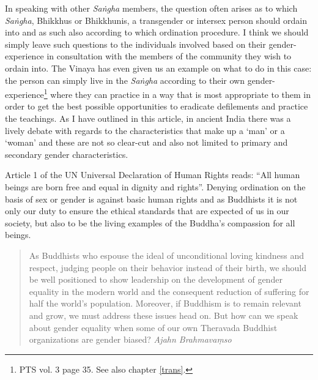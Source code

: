 In speaking with other {\em Saṅgha} members, the question often arises as to which {\em Saṅgha}, Bhikkhus or Bhikkhunis, a transgender or intersex person should ordain into and as such also according to which ordination procedure. I think we should simply leave such questions to the individuals involved based on their gender-experience in consultation with the members of the community they wish to ordain into. The Vinaya has even given us an example on what to do in this case: the person can simply live in the {\em Saṅgha} according to their own gender-experience\footnote{PTS vol. 3 page 35. See also chapter \ref{trans}.} where they can practice in a way that is most appropriate to them in order to get the best possible opportunities to eradicate defilements and practice the teachings. As I have outlined in this article, in ancient India there was a lively debate with regards to the characteristics that make up a `man' or a `woman' and these are not so clear-cut and also not limited to primary and secondary gender characteristics.

Article 1 of the UN Universal Declaration of Human Rights reads: ``All human beings are born free and equal in dignity and rights''. Denying ordination on the basis of sex or gender is against basic human rights and as Buddhists it is not only our duty to ensure the ethical standards that are expected of us in our society, but also to be the living examples of the Buddha's compassion for all beings.

\begin{quote}
As Buddhists who espouse the ideal of unconditional loving kindness and respect, judging people on their behavior instead of their birth, we should be well positioned to show leadership on the development of gender equality in the modern world and the consequent reduction of suffering for half the world’s population. Moreover, if Buddhism is to remain relevant and grow, we must address these issues head on. But how can we speak about gender equality when some of our own Theravada Buddhist organizations are gender biased? {\em Ajahn Brahmavaṃso}
\end{quote}
